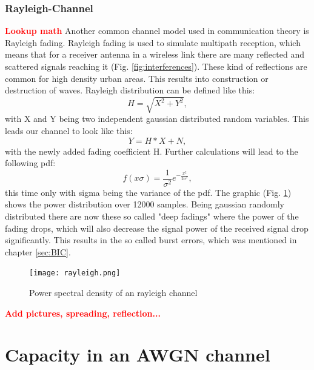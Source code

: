 \documentclass[12pt,oneside, reqno]{report}
\newcommand\boldred[1]{\textcolor{red}{\textbf{#1}}}
\begin{document}
\subsection{Rayleigh-Channel}
\boldred{Lookup math}
\newline
Another common channel model used in communication theory is Rayleigh fading. Rayleigh fading is used to simulate multipath reception, which means that for a receiver antenna in a wireless link there are many reflected and scattered signals reaching it (Fig. \ref{fig:interferences}). These kind of reflections are common for high density urban areas. This results into construction or destruction of waves. Rayleigh distribution can be defined like this: 
\newline
\begin{equation}
\label{eq:rayleigh}
 H = \sqrt{X^2 + Y^2},
\end{equation}
with X and Y being two independent gaussian distributed random variables. This leads our channel to look like this:
\newline
\begin{equation}
\label{eq:rayleighchan}
Y = H * X + N,
\end{equation}
with the newly added fading coefficient H.
\newline
Further calculations will lead to the following pdf:
\begin{equation}
\label{eq:raypdf}
f(x\sigma) = \frac{1}{\sigma^2}e^{-\frac{x^2}{2\sigma^2}},
\end{equation}
this time only with sigma being the variance of the pdf. The graphic (Fig. \ref{fig:rayleigh}) shows the power distribution over 12000 samples. Being gaussian randomly distributed there are now these so called "deep fadings" where the power of the fading drops, which will also decrease the signal power of the received signal drop significantly. This results in the so called burst errors, which was mentioned in chapter \ref{sec:BIC}.
\begin{figure}[H]
	\centering
	\texttt{[image: rayleigh.png]}
	\caption{Power spectral density of an rayleigh channel}
	\label{fig:rayleigh}
\end{figure}

\boldred{Add pictures, spreading, reflection...}
	
\newpage
\chapter{Capacity in an AWGN channel}
\end{document}
